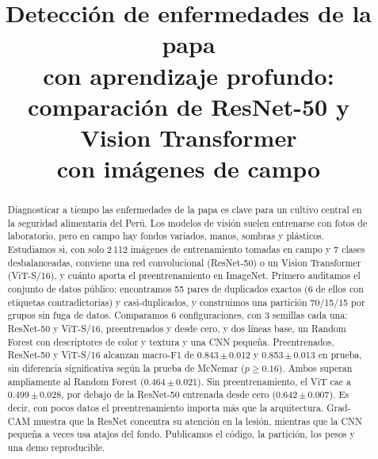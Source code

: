 \documentclass[conference,a4paper]{IEEEtran}
\newcommand{\pmsd}[2]{#1\,$\pm$\,#2}
\begin{document}
\title{Detección de enfermedades de la papa\\
con aprendizaje profundo:\\
comparación de ResNet-50 y Vision Transformer\\
con imágenes de campo}

\author{
}

\maketitle

\begin{abstract}
Diagnosticar a tiempo las enfermedades de la papa es clave para un cultivo central en la seguridad alimentaria del Perú. Los modelos de visión suelen entrenarse con fotos de laboratorio, pero en campo hay fondos variados, manos, sombras y plásticos. Estudiamos si, con solo 2\,112 imágenes de entrenamiento tomadas en campo y 7 clases desbalanceadas, conviene una red convolucional (ResNet-50) o un Vision Transformer (ViT-S/16), y cuánto aporta el preentrenamiento en ImageNet. Primero auditamos el conjunto de datos público: encontramos 55 pares de duplicados exactos (6 de ellos con etiquetas contradictorias) y casi-duplicados, y construimos una partición 70/15/15 por grupos sin fuga de datos. Comparamos 6 configuraciones, con 3 semillas cada una: ResNet-50 y ViT-S/16, preentrenados y desde cero, y dos líneas base, un Random Forest con descriptores de color y textura y una CNN pequeña. Preentrenados, ResNet-50 y ViT-S/16 alcanzan macro-F1 de \pmsd{0.843}{0.012} y \pmsd{0.853}{0.013} en prueba, sin diferencia significativa según la prueba de McNemar ($p\geq0.16$). Ambos superan ampliamente al Random Forest (\pmsd{0.464}{0.021}). Sin preentrenamiento, el ViT cae a \pmsd{0.499}{0.028}, por debajo de la ResNet-50 entrenada desde cero (\pmsd{0.642}{0.007}). Es decir, con pocos datos el preentrenamiento importa más que la arquitectura. Grad-CAM muestra que la ResNet concentra su atención en la lesión, mientras que la CNN pequeña a veces usa atajos del fondo. Publicamos el código, la partición, los pesos y una demo reproducible.
\end{abstract}
\end{document}
